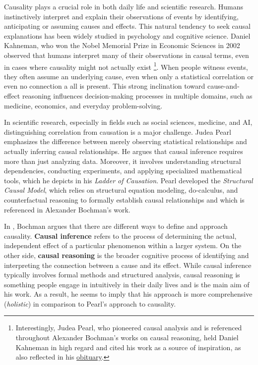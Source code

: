 \documentclass[seminar,palatino,english]{AIGpaper}
\begin{document}
Causality plays a crucial role in both daily life and scientific research. Humans instinctively interpret and explain their observations of events by identifying, anticipating or assuming causes and effects. This natural tendency to seek causal explanations has been widely studied in psychology and cognitive science. Daniel Kahneman, who won the Nobel Memorial Prize in Economic Sciences in 2002 observed that humans interpret many of their observations in causal terms, even in cases where causality might not actually exist \cite{kahneman_thinking_2013, kahneman_noise_2021}\footnote{Interestingly, Judea Pearl, who pioneered causal analysis and is referenced throughout Alexander Bochman's works on causal reasoning, held Daniel Kahneman in high regard and cited his work as a source of inspiration, as also reflected in his \href{https://jewishjournal.com/judaism/obituaries/369905/a-tribute-to-daniel-kahneman-israeli-born-psychologist-who-won-the-nobel-prize-in-economics-2002-for-asking-are-humans-rational/}{obituary}.}. When people witness events, they often assume an underlying cause, even when only a statistical correlation or even no connection a all is present. This strong inclination toward cause-and-effect reasoning influences decision-making processes in multiple domains, such as medicine, economics, and everyday problem-solving.

In scientific research, especially in fields such as social sciences, medicine, and AI, distinguishing correlation from causation is a major challenge. Judea Pearl \cite{pearl_causality_2000,pearl_book_2018} emphasizes the difference between merely observing statistical relationships and actually inferring causal relationships. He argues that causal inference requires more than just analyzing data. Moreover, it involves understanding structural dependencies, conducting experiments, and applying specialized mathematical tools, which he depicts in his \emph{Ladder of Causation}. Pearl developed the \emph{Structural Causal Model}, which relies on structural equation modeling, do-calculus, and counterfactual reasoning to formally establish causal relationships and which is referenced in Alexander Bochman's work.

In \cite{bochman_logical_2021}, Bochman argues that there are different ways to define and approach causality. \textbf{Causal inference} refers to the process of determining the actual, independent effect of a particular phenomenon within a larger system. On the other side, \textbf{causal reasoning} is the broader cognitive process of identifying and interpreting the connection between a cause and its effect. While causal inference typically involves formal methods and structured analysis, causal reasoning is something people engage in intuitively in their daily lives and is the main aim of his work. As a result, he seems to imply that his approach is more comprehensive (\emph{holistic}) in comparison to Pearl's approach to causality.
\end{document}
